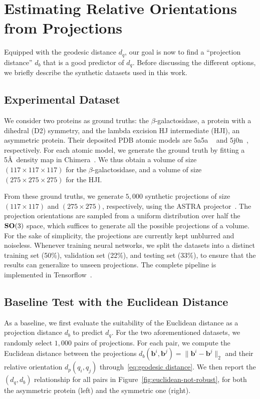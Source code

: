 \section{Estimating Relative Orientations from Projections}
\label{sec:estimating-relative-orientations}

Equipped with the geodesic distance $d_q$, our goal is now to find a ``projection distance'' $d_b$ that is a good predictor of $d_q$. Before discussing the different options, we briefly describe the synthetic datasets used in this work.  

\subsection{Experimental Dataset}
\label{subsec:datasets}

We consider two proteins as ground truths: the $\beta$-galactosidase, a protein with a dihedral (D2) symmetry, and the lambda excision HJ intermediate (HJI), an asymmetric protein. Their deposited PDB atomic models are 5a5a ~\cite{bartesaghi2015betagal} and 5j0n~\cite{laxmikanthan2016structure}, respectively. For each atomic model, we generate the ground truth by fitting a 5\AA\ density map in Chimera~\cite{pettersen2004ucsf}. We thus obtain a volume of size $(117\times 117\times 117)$ for the $\beta$-galactosidase, and a volume of size $(275\times 275\times 275)$ for the HJI.  

From these ground truths, we generate $5,000$ synthetic projections of size $(117\times 117)$ and $(275\times 275)$, respectively, using the ASTRA projector~\cite{van2015astra}. The projection orientations are sampled from a uniform distribution over half the $\mathrm{\mathbf{SO}}(3)$ space, which suffices to generate all the possible projections of a volume. For the sake of simplicity, the projections are currently kept unblurred and noiseless. Whenever training neural networks, we split the datasets into a distinct training set (50\%), validation set (22\%), and testing set (33\%), to ensure that the results can generalize to unseen projections. The complete pipeline is implemented in Tensorflow~\cite{abadi2016tensorflow}. 


\subsection{Baseline Test with the Euclidean Distance}

As a baseline, we first evaluate the suitability of the Euclidean distance as a projection distance $d_b$ to predict $d_q$. For the two aforementioned datasets, we randomly select $1,000$ pairs of projections. For each pair, we compute the Euclidean distance between the projections $d_b(\mathbf{b}^i,\mathbf{b}^j)=\lVert\mathbf{b}^i-\mathbf{b}^j\rVert_2$ and their relative orientation $d_p(q_i,q_j)$ through~\eqref{eq:geodesic distance}. We then report the $(d_q,d_b)$ relationship for all pairs in Figure~\ref{fig:euclidean-not-robust}, for both the asymmetric protein (left) and the symmetric one (right). 


